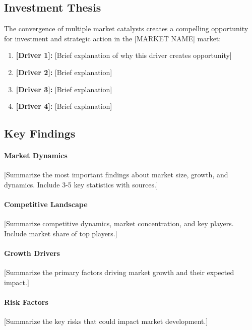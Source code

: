 \documentclass[11pt,letterpaper]{report}
\newcommand{\reporttitle}{[MARKET NAME]}
\begin{document}
\subsection{Investment Thesis}

The convergence of multiple market catalysts creates a compelling opportunity for investment and strategic action in the \reporttitle{} market:

\begin{keyinsightbox}
\begin{enumerate}
    \item \textbf{[Driver 1]:} [Brief explanation of why this driver creates opportunity]
    \item \textbf{[Driver 2]:} [Brief explanation]
    \item \textbf{[Driver 3]:} [Brief explanation]
    \item \textbf{[Driver 4]:} [Brief explanation]
\end{enumerate}
\end{keyinsightbox}

\subsection{Key Findings}

\paragraph{Market Dynamics}
[Summarize the most important findings about market size, growth, and dynamics. Include 3-5 key statistics with sources.]

\paragraph{Competitive Landscape}
[Summarize competitive dynamics, market concentration, and key players. Include market share of top players.]

\paragraph{Growth Drivers}
[Summarize the primary factors driving market growth and their expected impact.]

\paragraph{Risk Factors}
[Summarize the key risks that could impact market development.]
\end{document}
